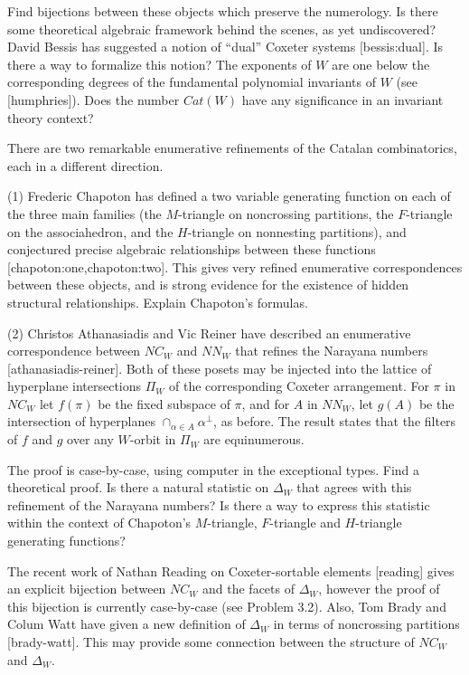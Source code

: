 \documentclass[12pt,letterpaper, reqno]{amsart}
\begin{document}
\begin{problemblock}
\begin{problem}[1.2]
Find bijections between these objects which preserve the numerology. Is
there some theoretical algebraic framework behind the scenes, as
yet undiscovered? David Bessis has suggested a notion of ``dual''
Coxeter systems [bessis:dual]. Is there a way to formalize this
notion? The exponents of $W$ are one below the corresponding degrees of
the fundamental polynomial invariants of $W$ (see [humphries]). Does
the number $Cat(W)$ have any significance in an invariant theory context?
\end{problem}

\begin{remark}
 There are two remarkable enumerative refinements of the Catalan combinatorics, each in a different direction.

(1) Frederic Chapoton has defined a two variable generating function
on each of the three main families (the $M$-triangle on noncrossing
partitions, the $F$-triangle on the associahedron, and the $H$-triangle
on nonnesting partitions), and conjectured precise algebraic relationships
between these functions [chapoton:one,chapoton:two]. This gives very
refined enumerative correspondences between these objects, and is strong
evidence for the existence of hidden structural relationships. Explain
Chapoton's formulas.

(2) Christos Athanasiadis and Vic Reiner have described an enumerative
correspondence between $NC_W$ and $NN_W$ that refines the Narayana numbers
[athanasiadis-reiner]. Both of these posets may be injected into the
lattice of hyperplane intersections $\Pi_W$ of the corresponding Coxeter
arrangement. For $\pi$ in $NC_W$ let $f(\pi)$ be the fixed subspace
of $\pi$, and for $ A$ in $NN_W$, let $g( A)$ be the intersection of
hyperplanes $\cap_{\alpha\in A} \alpha^{\perp}$, as before. The result
states that the filters of $f$ and $g$ over any $W$-orbit in $\Pi_W$
are equinumerous.

The proof is case-by-case, using computer in the exceptional types. Find
a theoretical proof. Is there a natural statistic on $\Delta_W$ that
agrees with this refinement of the Narayana numbers? Is there a way to
express this statistic within the context of Chapoton's $M$-triangle,
$F$-triangle and $H$-triangle generating functions?
\end{remark}

\begin{remark}The recent work of Nathan Reading on Coxeter-sortable elements
[reading] gives an explicit bijection between $NC_W$ and the
facets of $\Delta_W$, however the proof of this bijection is currently
case-by-case (see Problem 3.2). Also, Tom Brady and Colum
Watt have given a new definition of $\Delta_W$ in terms of noncrossing
partitions [brady-watt]. This may provide some connection between
the structure of $NC_W$ and $\Delta_W$.
\end{remark}

\end{problemblock}
\end{document}
